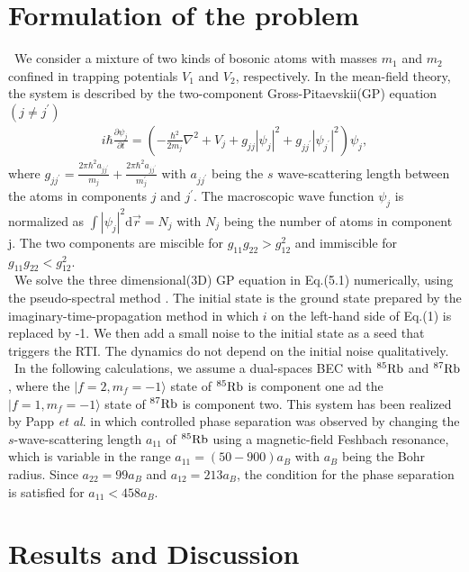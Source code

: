 \documentclass[12pt,a4paper]{report} %
\newcommand{\diff}{\mathrm{d}}				%
\begin{document}
\section{Formulation of the problem}
\ We consider a mixture of two kinds of bosonic atoms with
masses $m_1$ and $m_2$ confined in trapping potentials $V_1$ and
$V_2$, respectively. In the mean-field theory, the system is described
by the two-component Gross-Pitaevskii(GP) equation $(j \neq j^\prime)$
\begin{eqnarray}
i \hbar \frac{\partial \psi_j}{\partial t} =
\left(
- \frac{\hbar^2}{2m_j} \nabla^2 + V_j + g_{jj} |\psi_j|^2 + g_{jj^\prime} |\psi_{j^\prime}|^2
\right) \psi_j,
\end{eqnarray}
where $\displaystyle g_{jj^\prime} = \frac{2 \pi \hbar^2 a_{jj^\prime}}{m_j}
+\frac{2 \pi \hbar^2 a_{jj^\prime}}{m_j^\prime}$ with $a_{jj^\prime}$ being the
$s$ wave-scattering length between the atoms in components $j$ and $j^\prime$.
The macroscopic wave function $\psi_j$ is normalized as $\int |\psi_j|^2 \diff \vec{r} = N_j$
with $N_j$ being the number of atoms in component j. The two components are miscible for 
$g_{11}g_{22} > g_{12}^2$ and immiscible for $g_{11}g_{22} < g_{12}^2$.
\\
\ We solve the three dimensional(3D) GP equation in Eq.(5.1)
numerically, using the pseudo-spectral method \cite{34}. The initial
state is the ground state prepared by the imaginary-time-propagation method
in which $i$ on the left-hand side of Eq.(1) is replaced by -1. We then add a small noise to
the initial state as a seed that triggers the RTI. The dynamics do not 
depend on the initial noise qualitatively.
\\
\ In the following calculations, we assume a dual-spaces 
BEC with $^{85} {\rm Rb}$ and $^{87} {\rm Rb}$, where the $|f=2, m_f = -1 \rangle$ state
of $^{85} {\rm Rb}$ is component one ad the $|f=1, m_f=-1 \rangle$ state
of $^{87} {\rm Rb}$ is component two. This system has been realized
by Papp {\it et al}.\cite{72} in which controlled phase separation
was observed by changing the $s$-wave-scattering length $a_{11}$
of $^{85} {\rm Rb}$ using a magnetic-field Feshbach resonance, which is
variable in the range $a_{11}=(50-900)a_B$ with $a_B$ being the Bohr
radius. Since $a_{22} = 99 a_B$ and $a_{12}=213a_B$, the condition for
the phase separation is satisfied for $a_{11} < 458 a_B$.


\section{Results and Discussion}
\end{document}
